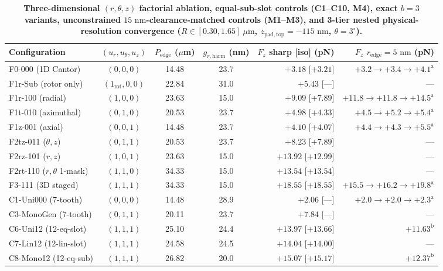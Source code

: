 \documentclass[11pt, a4paper]{article}
\begin{document}
\begin{table}[htbp]
\centering
\small
\caption{\textbf{Three-dimensional $(r,\theta,z)$ factorial ablation, equal-sub-slot controls (C1--C10, M4), exact $b=3$ variants, unconstrained $15\text{ nm}$-clearance-matched controls (M1--M3), and 3-tier nested physical-resolution convergence ($R \in [0.30, 1.65]\ \mu\text{m}$, $z_{\mathrm{pad,top}}=-115\text{ nm}$, $\theta=3^\circ$).}}
\label{tab:unified_3d_fractal_factorial}
\begin{tabular}{l c c c r r}
\toprule
Configuration & $(u_r,u_\theta,u_z)$ & $P_{\mathrm{edge}}$ ($\mu$m) & $g_{r,\mathrm{harm}}$ (nm) & $F_z$ sharp [iso] (pN) & $F_z$ $r_{\mathrm{edge}}{=}5\text{ nm}$ (pN) \\
\midrule
F0-000 (1D Cantor) & $(0,0,0)$ & 14.48 & 23.7 & $+3.18$ [$+3.21$] & $+3.2 \to +3.4 \to +4.1^{\mathrm{a}}$ \\
F1r-Sub (rotor only) & $(1_{\mathrm{rot}},0,0)$ & 22.84 & 31.0 & $+5.43$ [---] & --- \\
F1r-100 (radial) & $(1,0,0)$ & 23.63 & 15.0 & $+9.09$ [$+7.89$] & $+11.8 \to +11.8 \to +14.5^{\mathrm{a}}$ \\
F1t-010 (azimuthal) & $(0,1,0)$ & 20.53 & 23.7 & $+4.98$ [$+4.33$] & $+4.5 \to +5.2 \to +5.4^{\mathrm{a}}$ \\
F1z-001 (axial) & $(0,0,1)$ & 14.48 & 23.7 & $+4.10$ [$+4.07$] & $+4.4 \to +4.3 \to +5.5^{\mathrm{a}}$ \\
F2tz-011 ($\theta,z$) & $(0,1,1)$ & 20.53 & 23.7 & $+8.23$ [$+7.89$] & --- \\
F2rz-101 ($r,z$) & $(1,0,1)$ & 23.63 & 15.0 & $+13.92$ [$+12.99$] & --- \\
F2rt-110 ($r,\theta$ 1-mask) & $(1,1,0)$ & 34.33 & 15.0 & $+13.54$ [$+13.54$] & --- \\
F3-111 (3D staged) & $(1,1,1)$ & 34.33 & 15.0 & $+18.55$ [$+18.55$] & $+15.5 \to +16.2 \to +19.8^{\mathrm{a}}$ \\
\midrule
C1-Uni000 (7-tooth) & $(0,0,0)$ & 14.48 & 28.9 & $+2.06$ [---] & $+2.0 \to +2.0 \to +2.3^{\mathrm{a}}$ \\
C3-MonoGen (7-tooth) & $(0,1,1)$ & 20.11 & 23.7 & $+7.84$ [---] & --- \\
C6-Uni12 (12-eq-slot) & $(1,1,1)$ & 25.10 & 24.4 & $+13.97$ [$+13.66$] & $+11.63^{\mathrm{b}}$ \\
C7-Lin12 (12-lin-slot) & $(1,1,1)$ & 24.58 & 24.5 & $+14.04$ [$+14.00$] & --- \\
C8-Mono12 (12-eq-sub) & $(1,1,1)$ & 26.82 & 20.0 & $+15.07$ [$+15.17$] & $+12.37^{\mathrm{b}}$ \\

\end{tabular}
\end{table}
\end{document}
